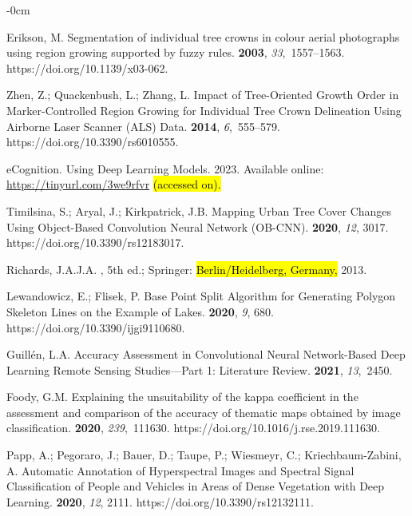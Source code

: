 \documentclass[remotesensing,article,accept,pdftex,moreauthors]{Definitions/mdpi}
\begin{document}
\begin{adjustwidth}{-\extralength}{0cm}
\begin{thebibliography}{999}
Erikson, M.
\newblock Segmentation of individual tree crowns in colour aerial photographs
  using region growing supported by fuzzy rules.
 {\bf 2003}, {\em
  33},~1557--1563. https://doi.org/10.1139/x03-062.

Zhen, Z.; Quackenbush, L.; Zhang, L.
\newblock Impact of Tree-Oriented Growth Order in Marker-Controlled Region
  Growing for Individual Tree Crown Delineation Using Airborne Laser Scanner
  (ALS) Data.
 {\bf 2014}, {\em
  6},~555--579.
\newblock https://doi.org/10.3390/rs6010555.

eCognition.
\newblock Using Deep Learning Models. 2023.  Available online: \url{https://tinyurl.com/3we9rfvr} \hl{(accessed on).}

Timilsina, S.; Aryal, J.; Kirkpatrick, J.B.
\newblock Mapping Urban Tree Cover Changes Using Object-Based Convolution
  Neural Network (OB-CNN).
 {\bf 2020}, {\em 12}, {3017}.
\newblock https://doi.org/10.3390/rs12183017.

Richards, J.A.J.A.
, 5th ed.; Springer:  \hl{Berlin/Heidelberg, Germany,} 
2013.

Lewandowicz, E.; Flisek, P.
\newblock Base Point Split Algorithm for Generating Polygon Skeleton Lines on
  the Example of Lakes.
 {\bf 2020}, {\em
  9}, {680}.
\newblock https://doi.org/10.3390/ijgi9110680.

Guillén, L.A.
\newblock Accuracy Assessment in Convolutional Neural Network-Based Deep
  Learning Remote Sensing Studies---Part 1: Literature Review.
 {\bf 2021}, {\em 13},~2450.

Foody, G.M.
\newblock Explaining the unsuitability of the kappa coefficient in the
  assessment and comparison of the accuracy of thematic maps obtained by image
  classification.
 {\bf 2020}, {\em 239},~111630.
\newblock https://doi.org/10.1016/j.rse.2019.111630.

Papp, A.; Pegoraro, J.; Bauer, D.; Taupe, P.; Wiesmeyr, C.; Kriechbaum-Zabini,
  A.
\newblock Automatic Annotation of Hyperspectral Images and Spectral Signal
  Classification of People and Vehicles in Areas of Dense Vegetation with Deep
  Learning.
 {\bf 2020}, {\em 12}, {2111}.
\newblock https://doi.org/10.3390/rs12132111.


\end{thebibliography}
\end{adjustwidth}
\end{document}
